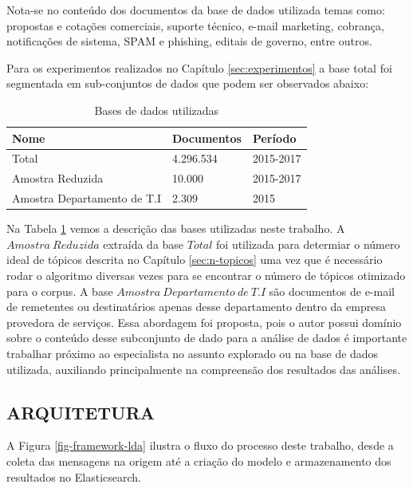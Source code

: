 \documentclass[12pt,a4paper]{article}
\begin{document}
Nota-se no conteúdo dos documentos da base de dados utilizada temas como: propostas e cotações comerciais, suporte técnico,
 e-mail marketing, cobrança, notificações de sistema, SPAM e phishing, editais de governo, entre outros.

Para os experimentos realizados no Capítulo \ref{sec:experimentos} a base total foi segmentada em sub-conjuntos de dados que podem ser observados abaixo:

\begin{table}[H]
  \centering
  \begin{tabular}{l l l}
  Nome  		              & Documentos & Período\\
  \hline
  Total                           & 4.296.534 & 2015-2017 \\
  Amostra Reduzida	              & 10.000    & 2015-2017 \\
  Amostra Departamento de T.I		  & 2.309     & 2015      \\
  \hline
  \end{tabular}
  \caption{Bases de dados utilizadas}
  \label{tab-base-de-dados}
\end{table}

Na Tabela \ref{tab-base-de-dados} vemos a descrição das bases utilizadas neste trabalho. A $Amostra\ Reduzida$ extraída da base $Total$ foi utilizada para determiar o número ideal de tópicos
 descrita no Capítulo \ref{sec:n-topicos} uma vez que é necessário rodar o algoritmo diversas vezes para se encontrar o número de tópicos otimizado para 
 o corpus. A base $Amostra\ Departamento\ de\ T.I$ são documentos de e-mail de remetentes ou destinatários apenas desse departamento dentro da empresa provedora
 de serviços. Essa abordagem foi proposta, pois o autor possui domínio sobre o conteúdo desse subconjunto de dado para a análise de dados é importante trabalhar próximo ao especialista
 no assunto explorado ou na base de dados utilizada, auxiliando principalmente na compreensão dos resultados das análises.

 \subsection{ARQUITETURA} \label{sec:arquitetura}

 A Figura \ref{fig-framework-lda} ilustra o fluxo do processo deste trabalho, desde a coleta das mensagens na origem até a criação do modelo e armazenamento dos resultados no Elasticsearch.
\end{document}
